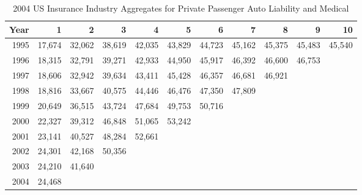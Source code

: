 \begin{exercises}
\begin{center}  \begin{table}[h]
 \caption{\label{T19:Wacek} 2004 US Insurance
Industry Aggregates for Private Passenger Auto Liability and Medical
}
\begin{tabular}{rrrrrrrrrrr}
\hline
      Year &          1 &          2 &          3 &          4 &          5 &          6 &          7 &          8 &          9 &         10 \\
\hline
      1995 &     17,674 &     32,062 &     38,619 &     42,035 &     43,829 &     44,723 &     45,162 &     45,375 &     45,483 &     45,540 \\
      1996 &     18,315 &     32,791 &     39,271 &     42,933 &     44,950 &     45,917 &     46,392 &     46,600 &     46,753 &            \\
      1997 &     18,606 &     32,942 &     39,634 &     43,411 &     45,428 &     46,357 &     46,681 &     46,921 &            &            \\
      1998 &     18,816 &     33,667 &     40,575 &     44,446 &     46,476 &     47,350 &     47,809 &            &            &            \\
      1999 &     20,649 &     36,515 &     43,724 &     47,684 &     49,753 &     50,716 &            &            &            &            \\
      2000 &     22,327 &     39,312 &     46,848 &     51,065 &     53,242 &            &            &            &            &            \\
      2001 &     23,141 &     40,527 &     48,284 &     52,661 &            &            &            &            &            &            \\
      2002 &     24,301 &     42,168 &     50,356 &            &            &            &            &            &            &            \\
      2003 &     24,210 &     41,640 &            &            &            &            &            &            &            &            \\
      2004 &     24,468 &            &            &            &            &            &            &            &            &            \\
\hline
\end{tabular}
\end{table}
\end{center}




\end{exercises}
